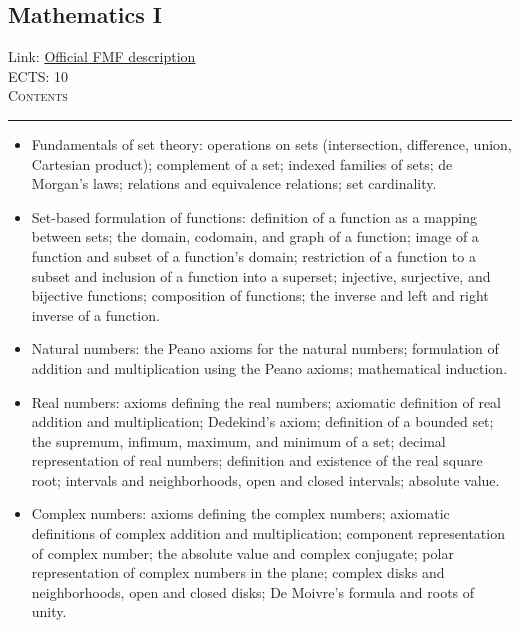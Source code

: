 \documentclass[11pt, a4paper]{article}
\newenvironment{course}[3]{
\subsection{#1}%
Link: \href{#2}{Official FMF description}\\%
ECTS: #3%
\vspace{1ex}
\\
{\large \textsc{Contents}}\\[-0.9ex]%
\rule{\textwidth}{0.5pt}
\vspace{-3ex}
}
{}
\newenvironment{chapter}[1]{
\begin{tcolorbox}[title=#1, breakable]
}
{\end{tcolorbox}}
\begin{document}
\begin{course}{Mathematics I}{https://www.fmf.uni-lj.si/en/study-physics/programmes/1fiz/2020/7000777/courses/520/}{10}
    \label{mathematics_1}
    
    \begin{chapter}{Sets and functions}
        \begin{itemize}
        
            \item Fundamentals of set theory: operations on sets (intersection, difference, union, Cartesian product); complement of a set; indexed families of sets; de Morgan's laws; relations and equivalence relations; set cardinality.

            \item Set-based formulation of functions: definition of a function as a mapping between sets; the domain, codomain, and graph of a function; image of a function and subset of a function's domain; restriction of a function to a subset and inclusion of a function into a superset; injective, surjective, and bijective functions; composition of functions; the inverse and left and right inverse of a function.
        
        \end{itemize}
    \end{chapter}

    \begin{chapter}{Numbers}
        \begin{itemize}
        
            \item Natural numbers: the Peano axioms for the natural numbers; formulation of addition and multiplication using the Peano axioms; mathematical induction. 

            \item Real numbers: axioms defining the real numbers; axiomatic definition of real addition and multiplication; Dedekind's axiom; definition of a bounded set; the supremum, infimum, maximum, and minimum of a set; decimal representation of real numbers; definition and existence of the real square root; intervals and neighborhoods, open and closed intervals; absolute value.

            \item Complex numbers: axioms defining the complex numbers; axiomatic definitions of complex addition and multiplication; component representation of complex number; the absolute value and complex conjugate; polar representation of complex numbers in the plane; complex disks and neighborhoods, open and closed disks; De Moivre's formula and roots of unity.
        

\end{itemize}
\end{chapter}
\end{course}
\end{document}

